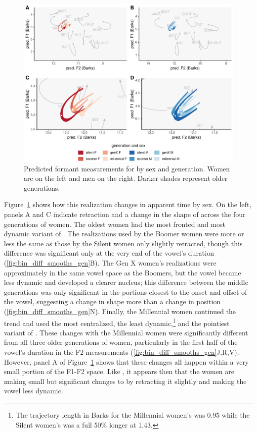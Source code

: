 \begin{figure}[tb!]
	\centering
	\includegraphics[width = 6.5in]{Figures/BIN/BIN_four_panel_plot.pdf}
	\caption[Predicted formant measurements for \bin by sex and generation.]{Predicted formant measurements for \bin by sex and generation. Women are on the left and men on the right. Darker shades represent older generations.}
	\label{fig:BIN_four_panel}
\end{figure}

Figure~\ref{fig:BIN_four_panel} shows how this realization changes in apparent time by sex. On the left, panels A and C indicate retraction and a change in the shape of \bin across the four generations of women. The oldest women had the most fronted and most dynamic variant of \bin. The realizations used by the Boomer women were more or less the same as those by the Silent women only slightly retracted, though this difference was significant only at the very end of the vowel's duration (\ref{fig:bin_diff_smooths_gen}B). The Gen X women's realizations were approximately in the same vowel space as the Boomers, but the vowel became less dynamic and developed a clearer nucleus; this difference between the middle generations was only significant in the portions closest to the onset and offset of the vowel, suggesting a change in shape more than a change in position (\ref{fig:bin_diff_smooths_gen}N). Finally, the Millennial women continued the trend and used the most centralized, the least dynamic,\footnote{The trajectory length in Barks for the Millennial women's \bin was 0.95 while the Silent women's was a full 50\% longer at 1.43.} and the pointiest variant of \bin. These changes with the Millennial women were significantly different from all three older generations of women, particularly in the first half of the vowel's duration in the F2 measurements (\ref{fig:bin_diff_smooths_gen}J,R,V). However, panel A of Figure~\ref{fig:BIN_four_panel} shows that these changes all happen within a very small portion of the F1-F2 space. Like \bit, it appears then that the women are making small but significant changes to \bin by retracting it slightly and making the vowel less dynamic.

